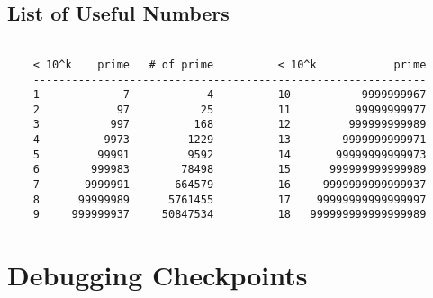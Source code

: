 \documentclass[landscape,8pt]{article}
\begin{document}
\begin{multicols}{2}
  \subsection{List of Useful Numbers}
  \begin{verbatim}

    < 10^k    prime   # of prime          < 10^k            prime
    -------------------------------------------------------------
    1             7            4          10           9999999967
    2            97           25          11          99999999977
    3           997          168          12         999999999989
    4          9973         1229          13        9999999999971
    5         99991         9592          14       99999999999973
    6        999983        78498          15      999999999999989
    7       9999991       664579          16     9999999999999937
    8      99999989      5761455          17    99999999999999997
    9     999999937     50847534          18   999999999999999989
  \end{verbatim}
\columnbreak

\section{Debugging Checkpoints}
\end{multicols}
\end{document}
